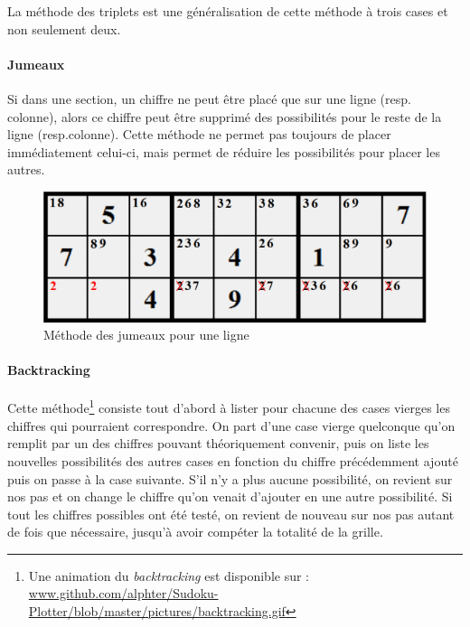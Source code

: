\documentclass[12pt,a4paper]{report}
\begin{document}
La méthode des triplets est une généralisation de cette méthode à trois cases et non seulement deux.

\paragraph{Jumeaux} Si dans une section, un chiffre ne peut être placé que sur une ligne (resp. colonne), alors ce chiffre peut être supprimé des possibilités pour le reste de la ligne (resp.colonne). Cette méthode ne permet pas toujours de placer immédiatement celui-ci, mais permet de réduire les possibilités pour placer les autres.
\begin{figure}[!h]
 \center
 \includegraphics[scale=0.6]{../pictures/jumeaux}
 \caption{Méthode des jumeaux pour une ligne}
\end{figure}

\paragraph{Backtracking} Cette méthode\footnote{Une animation du \emph{backtracking} est disponible sur : \url{www.github.com/alphter/Sudoku-Plotter/blob/master/pictures/backtracking.gif}} consiste tout d'abord à lister pour chacune des cases vierges les chiffres qui pourraient correspondre. On part d'une case vierge quelconque qu'on remplit par un des chiffres pouvant théoriquement convenir, puis on liste les nouvelles possibilités des autres cases en fonction du chiffre précédemment ajouté puis on passe à la case suivante. S'il n'y a plus aucune possibilité, on revient sur nos pas et on change le chiffre qu'on venait d'ajouter en une autre possibilité. Si tout les chiffres possibles ont été testé, on revient de nouveau sur nos pas autant de fois que nécessaire, jusqu'à avoir compéter la totalité de la grille. 

\end{document}
